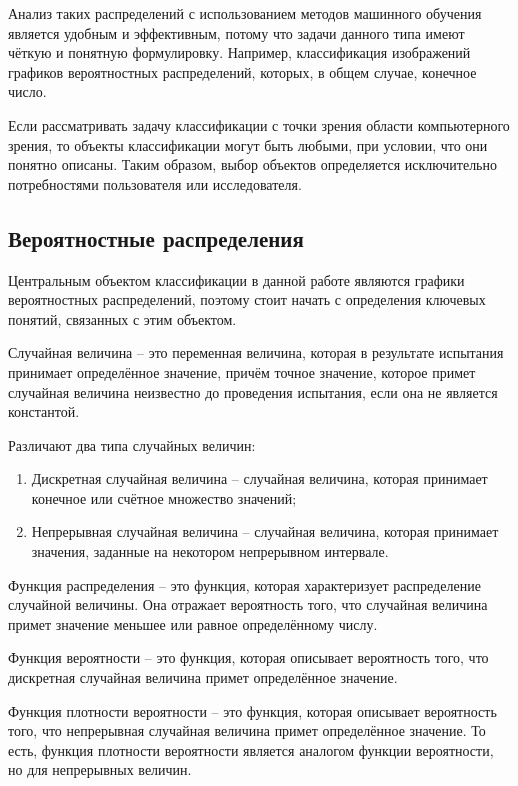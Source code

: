 \documentclass[14pt, russian]{scrartcl}
\begin{document}
Анализ таких распределений с использованием методов машинного обучения является удобным и эффективным, потому что задачи данного типа имеют чёткую и понятную формулировку. Например, классификация изображений графиков вероятностных распределений, которых, в общем случае, конечное число. 

Если рассматривать задачу классификации с точки зрения области компьютерного зрения, то объекты классификации могут быть любыми, при условии, что они понятно описаны. Таким образом, выбор объектов определяется исключительно потребностями пользователя или исследователя.

\subsection{Вероятностные распределения}
Центральным объектом классификации в данной работе являются графики вероятностных распределений, поэтому стоит начать с определения ключевых понятий, связанных с этим объектом.

Случайная величина -- это переменная величина, которая в результате испытания принимает определённое значение, причём точное значение, которое примет случайная величина неизвестно до проведения испытания, если она не является константой\cite{teorver1}.

Различают два типа случайных величин\cite{teorver2}: 

\begin{enumerate}
    \item Дискретная случайная величина -- случайная величина, которая принимает конечное или счётное множество значений;
    \item Непрерывная случайная величина -- случайная величина, которая принимает значения, заданные на некотором непрерывном интервале.
\end{enumerate}

Функция распределения -- это функция, которая характеризует распределение случайной величины. Она отражает вероятность того, что случайная величина примет значение меньшее или равное определённому числу.

Функция вероятности -- это функция, которая описывает вероятность того, что дискретная случайная величина примет определённое значение.

Функция плотности вероятности -- это функция, которая описывает вероятность того, что непрерывная случайная величина примет определённое значение. То есть, функция плотности вероятности является аналогом функции вероятности, но для непрерывных величин.
\end{document}
